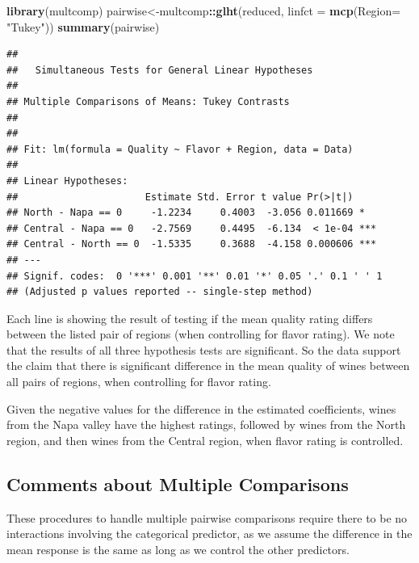 \documentclass[
]{book}
\newenvironment{Shaded}{\begin{snugshade}}{\end{snugshade}}
\newcommand{\AttributeTok}[1]{\textcolor[rgb]{0.13,0.29,0.53}{#1}}
\newcommand{\FunctionTok}[1]{\textcolor[rgb]{0.13,0.29,0.53}{\textbf{#1}}}
\newcommand{\NormalTok}[1]{#1}
\newcommand{\OtherTok}[1]{\textcolor[rgb]{0.56,0.35,0.01}{#1}}
\newcommand{\SpecialCharTok}[1]{\textcolor[rgb]{0.81,0.36,0.00}{\textbf{#1}}}
\newcommand{\StringTok}[1]{\textcolor[rgb]{0.31,0.60,0.02}{#1}}
\begin{document}
\begin{Shaded}
\begin{Highlighting}[]
\FunctionTok{library}\NormalTok{(multcomp)}
\NormalTok{pairwise}\OtherTok{\textless{}{-}}\NormalTok{multcomp}\SpecialCharTok{::}\FunctionTok{glht}\NormalTok{(reduced, }\AttributeTok{linfct =} \FunctionTok{mcp}\NormalTok{(}\AttributeTok{Region=} \StringTok{"Tukey"}\NormalTok{))}
\FunctionTok{summary}\NormalTok{(pairwise)}
\end{Highlighting}
\end{Shaded}

\begin{verbatim}
## 
##   Simultaneous Tests for General Linear Hypotheses
## 
## Multiple Comparisons of Means: Tukey Contrasts
## 
## 
## Fit: lm(formula = Quality ~ Flavor + Region, data = Data)
## 
## Linear Hypotheses:
##                      Estimate Std. Error t value Pr(>|t|)    
## North - Napa == 0     -1.2234     0.4003  -3.056 0.011669 *  
## Central - Napa == 0   -2.7569     0.4495  -6.134  < 1e-04 ***
## Central - North == 0  -1.5335     0.3688  -4.158 0.000606 ***
## ---
## Signif. codes:  0 '***' 0.001 '**' 0.01 '*' 0.05 '.' 0.1 ' ' 1
## (Adjusted p values reported -- single-step method)
\end{verbatim}

Each line is showing the result of testing if the mean quality rating differs between the listed pair of regions (when controlling for flavor rating). We note that the results of all three hypothesis tests are significant. So the data support the claim that there is significant difference in the mean quality of wines between all pairs of regions, when controlling for flavor rating.

Given the negative values for the difference in the estimated coefficients, wines from the
Napa valley have the highest ratings, followed by wines from the North region, and then
wines from the Central region, when flavor rating is controlled.

\hypertarget{comments-about-multiple-comparisons}{%
\subsection{Comments about Multiple Comparisons}\label{comments-about-multiple-comparisons}}

These procedures to handle multiple pairwise comparisons require there to be no interactions involving the categorical predictor, as we assume the difference in the mean response is the same as long as we control the other predictors.
\end{document}
